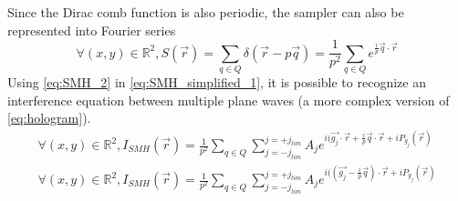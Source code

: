 \documentclass[12pt]{article}
\begin{document}
Since the Dirac comb function is also periodic, the sampler can also be represented into Fourier series
\begin{equation}
\forall (x,y) \in \mathbb{R}^{2}, S(\vec{r})=\sum_{q\in Q}\delta(\vec{r}-p\vec{q}) = \frac{1}{p^2}\sum_{q\in Q}e^{\frac{i}{p}\vec{q}\cdot\vec{r}}
\label{eq:SMH_2}
\end{equation}
Using \cref{eq:SMH_2} in \cref{eq:SMH_simplified_1}, it is possible to recognize an interference equation between multiple plane waves (a more complex version of \cref{eq:hologram}).
\begin{equation}
\begin{gathered}
\forall (x,y) \in \mathbb{R}^{2}, I_{SMH}(\vec{r})=\frac{1}{p^2}\sum_{q\in Q}\sum_{j=-j_{lim}}^{j=+j_{lim}}A_je^{i(\vec{g_j}\cdot\vec{r}+\frac{i}{p}\vec{q}\cdot\vec{r}+iP_{g_{j}}(\vec{r})} \\
\forall (x,y) \in \mathbb{R}^{2}, I_{SMH}(\vec{r})=\frac{1}{p^2}\sum_{q\in Q}\sum_{j=-j_{lim}}^{j=+j_{lim}}A_je^{i((\vec{g_j}-\frac{i}{p}\vec{q})\cdot\vec{r}+iP_{g_{j}}(\vec{r})}
\end{gathered}
\label{eq:SMH_3}
\end{equation}
\end{document}
